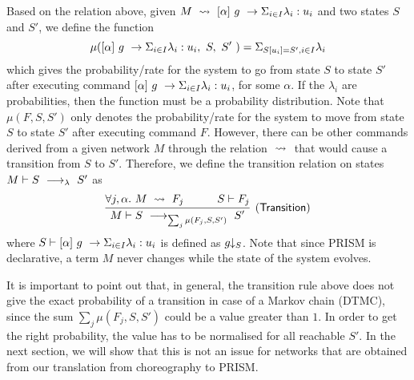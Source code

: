 Based on the relation above, given
$M\ \stackrel{}{\rightsquigarrow}\ [\alpha]\ g\ \rightarrow \Sigma_{i\in I}\lambda_i: u_i$ and two
states $S$ and $S'$, we define the function
$$\mu([\alpha]\ g\ \rightarrow \Sigma_{i\in I}\lambda_i: u_i,\ S,\ S'\ ) = \Sigma_{S[u_i]=S',i\in I}\lambda_i$$
which gives the probability/rate for the system to go from state $S$
to state $S'$ after executing command $[\alpha]\ g\ \rightarrow \Sigma_{i\in I}\lambda_i: u_i$,
for some $\alpha$.
%
If the $\lambda_i$ are probabilities, then the function must be a
probability distribution. Note that $\mu(F,S,S')$ only denotes the
probability/rate for the system to move from state $S$ to state $S'$
after executing command $F$. However, there can be other commands
derived from a given network $M$ through the relation $\ \stackrel{}{\rightsquigarrow}\ $
that would cause a transition from $S$ to $S'$. Therefore, we define
the transition relation on states $M\vdash S\ \longrightarrow_{\lambda}\ S'$ as
$$
\infer[\mathsf{(Transition)}]
{
  M\vdash S\red{\sum_{j} \mu(F_j,S,S')}S'
}
{
  \forall j,\alpha.\ M\prismred{}F_j
  \quad&\quad
  S\vdash F_j
}
$$
where $S\vdash [\alpha]\ g\ \rightarrow \Sigma_{i\in I}\lambda_i: u_i$ is defined as $g\!\!\downarrow_{S}$.
Note that since PRISM is declarative, a term $M$ never changes while
the state of the system evolves.

It is important to point out that, in general, the transition rule
above does not give the exact probability of a transition in case of a
Markov chain (DTMC), since the sum ${\sum_{j} \mu(F_j,S,S')}$ could be
a value greater than $1$. In order to get the right probability, the
value has to be normalised for all reachable $S'$. In the next
section, we will show that this is not an issue for networks that are
obtained from our translation from choreography to PRISM.



